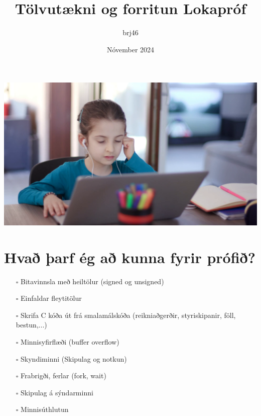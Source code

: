 \documentclass{article}
\title{Tölvutækni og forritun Lokapróf}
\author{brj46 }
\date{Nóvember 2024}
\begin{document}
\maketitle

\vspace{5em}

\begin{center}
    \includegraphics[scale = 0.2]{myndir/study.png}
\end{center}

\newpage

\section{Hvað þarf ég að kunna fyrir prófið?}

\begin{itemize}
    \item[$\square$] Bitavinnsla með heiltölur (signed og unsigned)
    \item[$\square$] Einfaldar fleytitölur
    \item[$\square$] Skrifa C kóða út frá smalamálskóða (reikniaðgerðir, styriskipanir, föll, bestun,...)
    \item[$\square$] Minnisyfirflæði (buffer overflow)
    \item[$\square$] Skyndiminni (Skipulag og notkun)
    \item[$\square$] Frabrigði, ferlar (fork, wait)
    \item[$\square$] Skipulag á sýndarminni
    \item[$\square$] Minnisúthlutun
\end{itemize}
\end{document}
